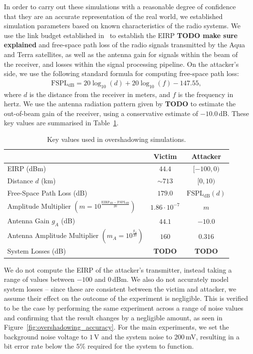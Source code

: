 In order to carry out these simulations with a reasonable degree of confidence that they are an accurate representation of the real world, we established simulation parameters based on known characteristics of the radio systems.
We use the link budget established in~\cite{quinnNew2003} to establish the EIRP \textbf{TODO make sure explained} and free-space path loss of the radio signals transmitted by the Aqua and Terra satellites, as well as the antenna gain for signals within the beam of the receiver, and losses within the signal processing pipeline.
On the attacker's side, we use the following standard formula for computing free-space path loss:
\begin{align}
    \text{FSPL}_{\text{dB}} = 20\log_{10}(d) + 20\log_{10}(f) - 147.55, \label{eq:fspl}
\end{align}
where $d$ is the distance from the receiver in meters, and $f$ is the frequency in hertz.
We use the antenna radiation pattern given by \textbf{TODO} to estimate the out-of-beam gain of the receiver, using a conservative estimate of $-10.0$\,dB.
These key values are summarised in Table~\ref{tab:experimental-values}.

\begin{table}
    \begin{tabular}{lcc}
        \toprule
        & Victim & Attacker \\
        \midrule
        EIRP (dBm) & $44.4$ & $[-100,0)$ \\
        Distance $d$ (km) & $\sim 713$ & $[0, 10)$ \\
        Free-Space Path Loss (dB) & $179.0$ & $\text{FSPL}_{\text{dB}}(d)$ \\
        Amplitude Multiplier $\left(m = 10^{\frac{\text{EIRP}_{\text{dB}}-\text{FSPL}_{\text{dB}}}{20}}\right)$ & $1.86 \cdot 10^{-7}$ & $m$  \\
        Antenna Gain $g_A$ (dB) & $44.1$ & $-10.0$ \\
        Antenna Amplitude Multiplier $\left( m_A = 10^{\frac{g_A}{20}} \right)$ & $160$ & $0.316$ \\
        System Losses (dB) & \textbf{TODO} & \textbf{TODO} \\
        \bottomrule
    \end{tabular}
    \caption{Key values used in overshadowing simulations.}
    \label{tab:experimental-values}
\end{table}

We do not compute the EIRP of the attacker's transmitter, instead taking a range of values between $-100$ and $0$\,dBm.
We also do not accurately model system losses -- since these are consistent between the victim and attacker, we assume their effect on the outcome of the experiment is negligible.
This is verified to be the case by performing the same experiment across a range of noise values and confirming that the result changes by a negligible amount, as seen in Figure~\ref{fig:overshadowing_accuracy}.
For the main experiments, we set the background noise voltage to $1\,$\textmu V and the system noise to $200$\,mV, resulting in a bit error rate below the $5$\% required for the system to function.

